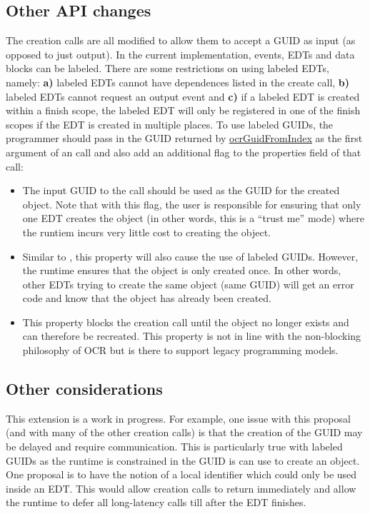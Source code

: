 \subsection{Other API changes}
The creation calls are all modified to allow them to accept a GUID as
input (as opposed to just output). In the current implementation, events, EDTs
and data blocks can be labeled. There are some restrictions on using labeled EDTs,
namely: {\bf a)} labeled EDTs cannot have dependences listed in the create call,
{\bf b)} labeled EDTs cannot request an output event and {\bf c)} if a labeled EDT
is created within a finish scope, the labeled EDT will only be registered in
one of the finish scopes if the EDT is created in multiple places. To use
labeled GUIDs, the programmer should pass in the GUID returned by
\hyperlink{func_ocrGuidFromIndex}{ocrGuidFromIndex} as the first argument of
an  call and also add an
additional flag to the properties field of that call:
\begin{itemize}
\item {} The input GUID to the call should
  be used as the GUID for the created object. Note that with this
  flag, the user is responsible for ensuring that only one EDT creates
  the object (in other words, this is a ``trust me'' mode) where the
  runtiem incurs very little cost to creating the object.
\item {} Similar to
  , this property will also cause the
  use of labeled GUIDs. However, the runtime ensures that the object
  is only created once. In other words, other EDTs trying to create
  the same object (same GUID) will get an error code and know that the
  object has already been created.
\item {} This property blocks the creation call
  until the object no longer exists and can therefore be
  recreated. This property is not in line with the non-blocking
  philosophy of OCR but is there to support legacy programming models.
\end{itemize}
\subsection{Other considerations}
This extension is a work in progress.
For example,
one issue with this proposal (and with many of the other creation
calls) is that the creation of the GUID may be delayed and require
communication. This is particularly true with labeled GUIDs as the
runtime is constrained in the GUID is can use to create an object. One
proposal is to have the notion of a local identifier which could only
be used inside an EDT. This would allow creation calls to return
immediately and allow the runtime to defer all long-latency calls till
after the EDT finishes.
